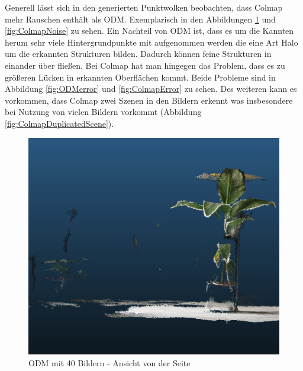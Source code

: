 \documentclass[12pt,titlepage, twoside]{article}
\begin{document}
Generell lässt sich in den generierten Punktwolken beobachten, dass Colmap mehr Rauschen enthält als ODM. Exemplarisch in den Abbildungen \ref{fig:ODMNoise} und \ref{fig:ColmapNoise} zu sehen. 
Ein Nachteil von ODM ist, dass es um die Kannten herum sehr viele Hintergrundpunkte mit aufgenommen werden die eine Art Halo um die erkannten Strukturen bilden. Dadurch können feine Strukturen in einander über fließen. 
Bei Colmap hat man hingegen das Problem, dass es zu größeren Lücken in erkannten Oberflächen kommt.
Beide Probleme sind in Abbildung \ref{fig:ODMerror} und \ref{fig:ColmapError} zu sehen. 
Des weiteren kann es vorkommen, dass Colmap zwei Szenen in den Bildern erkennt was insbesondere bei Nutzung von vielen Bildern vorkommt (Abbildung \ref{fig:ColmapDuplicatedScene}).

\begin{figure}
    \centering
    \begin{minipage}{0.475\textwidth}
        \centering
        \includegraphics[width=1.0\textwidth]{./Images/ODMNoise2.png}
        \caption{ODM mit 40 Bildern - Ansicht von der Seite}
        \label{fig:ODMNoise}
    \end{minipage}\hfill
    \begin{minipage}{0.475\textwidth}
        \centering

\end{minipage}
\end{figure}
\end{document}
